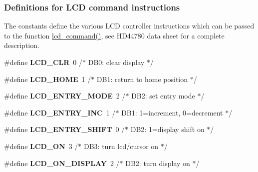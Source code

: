 \subsubsection*{Definitions for L\+CD command instructions}
\label{_amgrpe1b1604cb195ab970ebf8b6b8b3e322f}%
The constants define the various L\+CD controller instructions which can be passed to the function \hyperlink{a00006_gaea9d14f02df06f948cb5a56776980826}{lcd\+\_\+command()}, see H\+D44780 data sheet for a complete description. \begin{DoxyCompactItemize}
\item 
\#define {\bfseries L\+C\+D\+\_\+\+C\+LR}~0 /$\ast$ D\+B0\+: clear display                  $\ast$/\hypertarget{a00006_ga459688213267d13ccfbeb2c9004988cb}{}\label{a00006_ga459688213267d13ccfbeb2c9004988cb}

\item 
\#define {\bfseries L\+C\+D\+\_\+\+H\+O\+ME}~1 /$\ast$ D\+B1\+: return to home position        $\ast$/\hypertarget{a00006_gae0e309ccad89222eb3457f2da9f2bb8d}{}\label{a00006_gae0e309ccad89222eb3457f2da9f2bb8d}

\item 
\#define {\bfseries L\+C\+D\+\_\+\+E\+N\+T\+R\+Y\+\_\+\+M\+O\+DE}~2 /$\ast$ D\+B2\+: set entry mode                 $\ast$/\hypertarget{a00006_gae5d757ddb6d94de8c82191b60b40e442}{}\label{a00006_gae5d757ddb6d94de8c82191b60b40e442}

\item 
\#define {\bfseries L\+C\+D\+\_\+\+E\+N\+T\+R\+Y\+\_\+\+I\+NC}~1 /$\ast$   D\+B1\+: 1=increment, 0=decrement     $\ast$/\hypertarget{a00006_gada766266a0be0d0040fbf86e23b58aa6}{}\label{a00006_gada766266a0be0d0040fbf86e23b58aa6}

\item 
\#define {\bfseries L\+C\+D\+\_\+\+E\+N\+T\+R\+Y\+\_\+\+S\+H\+I\+FT}~0 /$\ast$   D\+B2\+: 1=display shift on           $\ast$/\hypertarget{a00006_ga14d0c7fda147e0dc8cdaa4a2629b3532}{}\label{a00006_ga14d0c7fda147e0dc8cdaa4a2629b3532}

\item 
\#define {\bfseries L\+C\+D\+\_\+\+ON}~3 /$\ast$ D\+B3\+: turn lcd/cursor on             $\ast$/\hypertarget{a00006_ga47a809dfec086fdeca93dedc4fb83b44}{}\label{a00006_ga47a809dfec086fdeca93dedc4fb83b44}

\item 
\#define {\bfseries L\+C\+D\+\_\+\+O\+N\+\_\+\+D\+I\+S\+P\+L\+AY}~2 /$\ast$   D\+B2\+: turn display on              $\ast$/\hypertarget{a00006_gae84f634b0a1661c4d5bbaafd9397732a}{}\label{a00006_gae84f634b0a1661c4d5bbaafd9397732a}


\end{DoxyCompactItemize}
